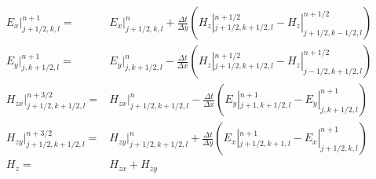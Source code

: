 %
\begin{subequations}
\begin{align}
E_x|^{n+1}_{j+1/2,k,l} = & E_x|^{n}_{j+1/2,k,l} + \frac{\Delta t}{\Delta y} \left(H_z|^{n+1/2}_{j+1/2,k+1/2,l}-H_z|^{n+1/2}_{j+1/2,k-1/2,l}\right) \\
%
E_y|^{n+1}_{j,k+1/2,l} = & E_y|^{n}_{j,k+1/2,l} - \frac{\Delta t}{\Delta x} \left(H_z|^{n+1/2}_{j+1/2,k+1/2,l}-H_z|^{n+1/2}_{j-1/2,k+1/2,l}\right) \\
%
H_{zx}|^{n+3/2}_{j+1/2,k+1/2,l} = & H_{zx}|^{n}_{j+1/2,k+1/2,l} - \frac{\Delta t}{\Delta x} \left(E_y|^{n+1}_{j+1,k+1/2,l}-E_y|^{n+1}_{j,k+1/2,l}\right) \\
%
H_{zy}|^{n+3/2}_{j+1/2,k+1/2,l} = & H_{zy}|^{n}_{j+1/2,k+1/2,l} + \frac{\Delta t}{\Delta y} \left(E_x|^{n+1}_{j+1/2,k+1,l}-E_x|^{n+1}_{j+1/2,k,l}\right) \\
%
H_z = & H_{zx}+H_{zy}
\end{align}
\end{subequations}
